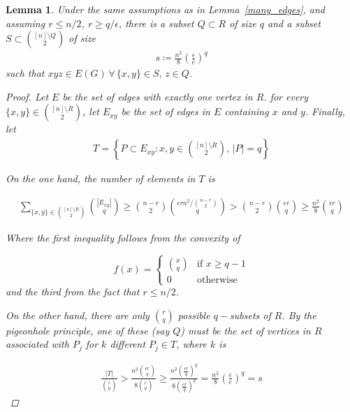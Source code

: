 \documentclass[12pt]{article}
\newtheorem{lemma}[thm]{Lemma}
\begin{document}
    \begin{lemma}\label{s}
        Under the same assumptions as in Lemma~\ref{many_edges},
        and assuming $r \leq n/2$, $r \geq q / \epsilon$,
        there is a subset $Q \subset R$
        of size $q$  and a subset $S \subset \binom{[n] \setminus Q}{2}$ of size
        \begin{align*}
            s \coloneqq \frac{n^2}{8} \left(\frac{\epsilon}{e}\right)^q %
        \end{align*}
        such that $xyz \in E(G) \, \forall \, \{x, y\} \in S, \, z \in Q$.

        \begin{proof}
            Let $E$ be the set of edges with exactly one vertex in $R$.
            for every $\{x, y\} \in \binom{[n] \setminus R}{2}$, let $E_{xy}$ be the set of
            edges in $E$ containing $x$ and $y$.
            Finally, let
            \begin{align*}
                T = \left\{P \subset E_{xy} : x, y \in \binom{[n] \setminus R}{2} , \, |P| = q\right\}
            \end{align*}

            On the one hand, the number of elements in $T$ is

            \begin{align*}
                \sum_{\{x, y\} \in \binom{[n] \setminus R}{2}} \binom{|E_{xy}|}{q}
                \geq
                \binom{n - r}{2} \binom{\epsilon r n^2 / \binom{n-r}{2}}{q}
                >
                \binom{n - r}{2} \binom{\epsilon r}{q}
                \geq
                \frac{n^2}{8} \binom{\epsilon r}{q}
            \end{align*}

            Where the first inequality follows from the convexity of

            \[
                f(x) =
                \begin{cases}
                   \binom{x}{q} & \text{if } x \geq q - 1 \\
                   0 & \text{otherwise}
                \end{cases}

            \]
            and the third
            from the fact that $r \leq n/2$.

            On the other hand, there are only $\binom{r}{q}$ possible $q-$subsets of $R$.
            By the pigeonhole principle, one of these (say $Q$) must be the set of
            vertices in $R$ associated with $P_j$ for $k$ different $P_j \in T$, where $k$ is

            \begin{align*}
                \frac{|T|}{\binom{r}{q}} > \frac{n^2 \binom{\epsilon r}{q}}{8 \binom{r}{q}} \geq
                \frac{n^2\left( \frac{\epsilon r}{q}\right)^q}{8\left(\frac{e r}{q}\right)^q} =
                \frac{n^2}{8} \left(\frac{\epsilon}{e}\right)^q = s
            \end{align*}

        \end{proof}
    \end{lemma}
\end{document}
